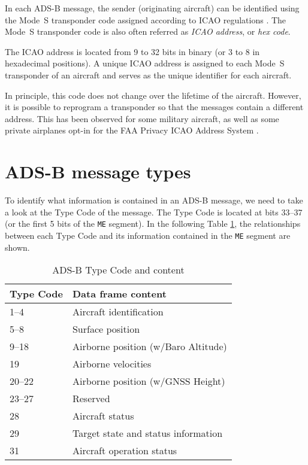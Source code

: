 In each ADS-B message, the sender (originating aircraft) can be identified using the Mode~S transponder code assigned according to ICAO regulations \cite{blythe2011}. The Mode~S transponder code is also often referred as \emph{ICAO address}, or \emph{hex code}. 

The ICAO address is located from 9 to 32 bits in binary (or 3 to 8 in hexadecimal positions). A unique ICAO address is assigned to each Mode~S transponder of an aircraft and serves as the unique identifier for each aircraft. 

In principle, this code does not change over the lifetime of the aircraft. However, it is possible to reprogram a transponder so that the messages contain a different address. This has been observed for some military aircraft, as well as some private airplanes opt-in for the FAA Privacy ICAO Address System \cite{gray2019}.


\section{ADS-B message types}

To identify what information is contained in an ADS-B message, we need to take a look at the Type Code of the message. The Type Code is located at bits 33--37 (or the first 5 bits of the \texttt{ME} segment). In the following Table \ref{tb:adsb-tc}, the relationships between each Type Code and its information contained in the \texttt{ME} segment are shown.

\begin{table}[ht]
\centering
\caption{ADS-B Type Code and content}
\label{tb:adsb-tc}
\begin{tabular}{|l|l|}
\hline
\textbf{Type Code} & \textbf{Data frame content} \\  \hline \hline
1--4     & Aircraft identification              \\  \hline
5--8     & Surface position                     \\  \hline
9--18    & Airborne position (w/Baro Altitude) \\  \hline
19        & Airborne velocities                  \\  \hline
20--22   & Airborne position (w/GNSS Height)   \\  \hline
23--27   & Reserved                             \\  \hline
28        & Aircraft status                      \\  \hline
29        & Target state and status information  \\  \hline
31        & Aircraft operation status            \\  \hline
\end{tabular}
\end{table}


